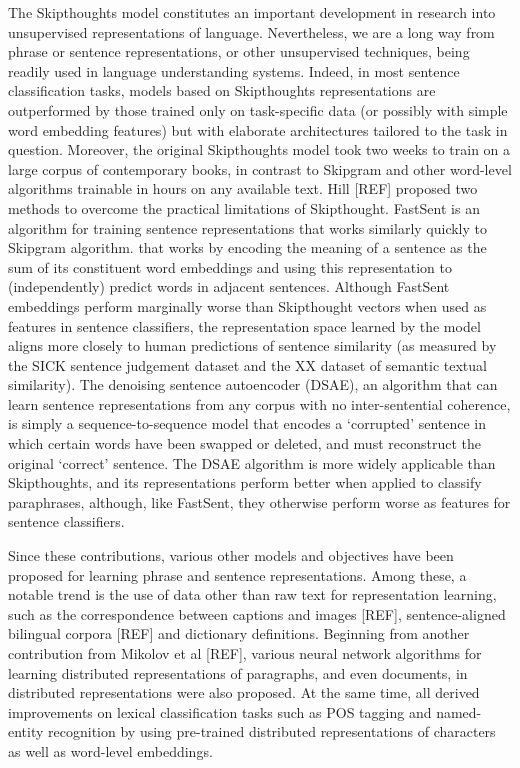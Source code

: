 \documentclass[11pt,letterpaper]{article}
\begin{document}
The Skipthoughts model constitutes an important development in research into unsupervised representations of language. Nevertheless, we are a long way from phrase or sentence representations, or other unsupervised techniques, being readily used in language understanding systems. Indeed, in most sentence classification tasks, models based on Skipthoughts representations are outperformed by those trained only on task-specific data (or possibly with simple word embedding features) but with elaborate architectures tailored to the task in question. Moreover, the original Skipthoughts model took two weeks to train on a large corpus of contemporary books, in contrast to Skipgram and other word-level algorithms trainable in hours on any available text. Hill [REF] proposed two methods to overcome the practical limitations of Skipthought. FastSent is an algorithm for training sentence representations that works similarly quickly to Skipgram algorithm. that works by encoding the meaning of a sentence as the sum of its constituent word embeddings and using this representation to (independently) predict words in adjacent sentences. Although FastSent embeddings perform marginally worse than Skipthought vectors when used as features in sentence classifiers, the representation space learned by the model aligns more closely to human predictions of sentence similarity (as measured by the SICK sentence judgement dataset and the XX dataset of semantic textual similarity). The denoising sentence autoencoder (DSAE), an algorithm that can learn sentence representations from any corpus with no inter-sentential coherence, is simply a sequence-to-sequence model that encodes a `corrupted' sentence in which certain words have been swapped or deleted, and must reconstruct the original `correct' sentence. The DSAE algorithm is more widely applicable than Skipthoughts, and its representations perform better when applied to classify paraphrases, although, like FastSent, they otherwise perform worse as features for sentence classifiers. 

Since these contributions, various other models and objectives have been proposed for learning phrase and sentence representations. Among these, a notable trend is the use of data other than raw text for representation learning, such as the correspondence between captions and images [REF], sentence-aligned bilingual corpora [REF] and dictionary definitions. Beginning from another contribution from Mikolov et al [REF], various neural network algorithms for learning distributed representations of paragraphs, and even documents, in distributed representations were also proposed. At the same time,\cite{dos2014learning,dos2015boosting,ling2015finding} all derived improvements on lexical classification tasks such as POS tagging and named-entity recognition by using pre-trained distributed representations of characters as well as word-level embeddings. 
\end{document}
